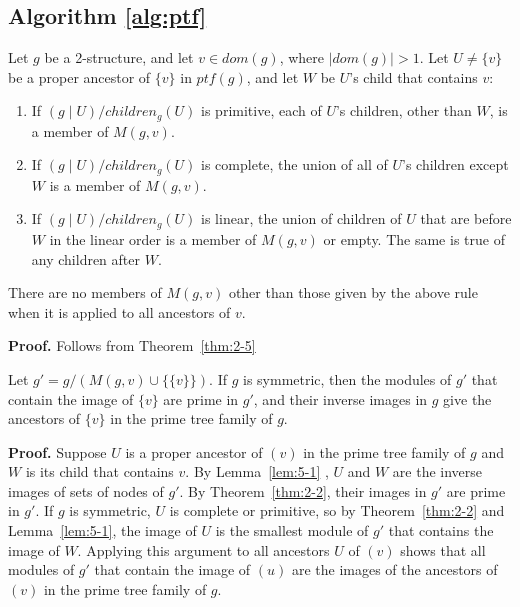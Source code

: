 \subsection{Algorithm \ref{alg:ptf}}\label{subsec:algorithm-ptf(g)}

\begin{mylem}
    \label{lem:5-1}
    Let $g$ be a 2-structure, and let $v \in dom(g)$, where $\mid dom(g) \mid > 1$.
    Let $U \neq \{v\}$ be a proper ancestor of $\{v\}$ in $ptf(g)$, and let $W$ be $U$'s child that contains $v$:
    \begin{enumerate}
        \item If $(g \mid U) / children_g(U)$ is primitive, each of $U$'s children, other than $W$, is a member of $M(g, v)$.
        \item If $(g \mid U) / children_g(U)$ is complete, the union of all of $U$'s children except $W$ is a member of $M(g, v)$.
        \item If $(g \mid U) / children_g(U)$ is linear, the union of children of $U$ that are before $W$ in the linear order is a member of $M(g, v)$ or empty.
        The same is true of any children after $W$.
    \end{enumerate}

    There are no members of $M(g, v)$ other than those given by the above rule when it is applied to all ancestors of $v$.
\end{mylem}

\textbf{Proof.}
Follows from Theorem~\ref{thm:2-5}

\begin{mytheo}
    \label{thm:5-2}
    Let $g' = g / (M(g, v) \cup \{\{v\}\})$.
    If $g$ is symmetric, then the modules of $g'$ that contain the image of $\{v\}$ are prime in $g'$, and their inverse images in $g$ give the ancestors of $\{v\}$ in the prime tree family of $g$.
\end{mytheo}

\textbf{Proof.}
Suppose $U$ is a proper ancestor of $(v)$ in the prime tree family of $g$ and $W$ is its child that contains $v$.
By Lemma~\ref{lem:5-1} , $U$ and $W$ are the inverse images of sets of nodes of $g'$.
By Theorem~\ref{thm:2-2}, their images in $g'$ are prime in $g'$.
If $g$ is symmetric, $U$ is complete or primitive, so by Theorem~\ref{thm:2-2} and Lemma~\ref{lem:5-1}, the image of $U$ is the smallest module of $g'$ that contains the image of $W$.
Applying this argument to all ancestors $U$ of $(v)$ shows that all modules of $g'$ that contain the image of $(u)$ are the images
of the ancestors of $(v)$ in the prime tree family of $g$.

